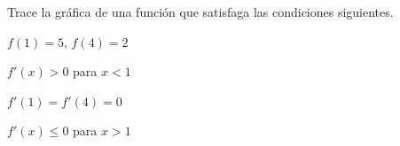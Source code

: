 \item Trace la gráfica de una función que satisfaga las condiciones siguientes.
    \begin{enumerate}
        \begin{minipage}{0.45\textwidth}
        \item[(a)] $f(1) = 5, \, f(4) = 2$
        \item[(c)] $f'(x) > 0$ para $x < 1$
        \end{minipage}%
        \begin{minipage}{0.45\textwidth}
        \item[(b)] $f'(1) = f'(4) = 0$
        \item[(d)] $f'(x) \le 0$ para $x > 1$
        \end{minipage}
    \end{enumerate}
